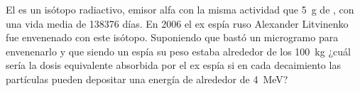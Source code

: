 \documentclass[./../main.tex]{subfiles}
\begin{document}
	\begin{exercise}
		El  es un isótopo radiactivo, emisor alfa con la misma actividad que \qty{5}{\g} de , con una vida media de \num{138376} días. En 2006 el ex espía ruso Alexander Litvinenko fue envenenado con este isótopo. Suponiendo que bastó un microgramo para envenenarlo y que siendo un espía su peso estaba alrededor de los \qty{100}{\kg} ¿cuál sería la dosis equivalente absorbida por el ex espía si en cada decaimiento las partículas pueden depositar una energía de alrededor de \qty{4}{\MeV}?
	\end{exercise}
\end{document}
